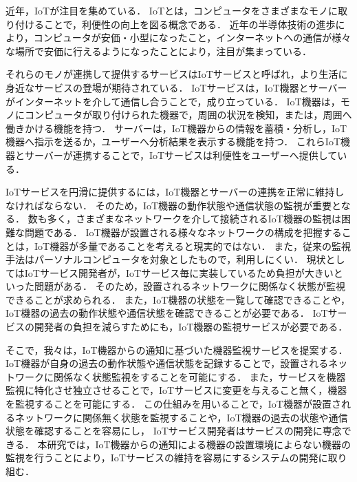 近年，IoTが注目を集めている．
IoTとは，コンピュータをさまざまなモノに取り付けることで，利便性の向上を図る概念である．
近年の半導体技術の進歩により，コンピュータが安価・小型になったこと，インターネットへの通信が様々な場所で安価に行えるようになったことにより，注目が集まっている．
\medskip

それらのモノが連携して提供するサービスはIoTサービスと呼ばれ，より生活に身近なサービスの登場が期待されている．
IoTサービスは，IoT機器とサーバーがインターネットを介して通信し合うことで，成り立っている．
IoT機器は，モノにコンピュータが取り付けられた機器で，周囲の状況を検知，または，周囲へ働きかける機能を持つ．
サーバーは，IoT機器からの情報を蓄積・分析し，IoT機器へ指示を送るか，ユーザーへ分析結果を表示する機能を持つ．
これらIoT機器とサーバーが連携することで，IoTサービスは利便性をユーザーへ提供している．
\medskip

IoTサービスを円滑に提供するには，IoT機器とサーバーの連携を正常に維持しなければならない．
そのため，IoT機器の動作状態や通信状態の監視が重要となる．
数も多く，さまざまなネットワークを介して接続されるIoT機器の監視は困難な問題である．
IoT機器が設置される様々なネットワークの構成を把握することは，IoT機器が多量であることを考えると現実的ではない．
また，従来の監視手法はパーソナルコンピュータを対象としたもので，利用しにくい．
現状としてはIoTサービス開発者が，IoTサービス毎に実装しているため負担が大きいといった問題がある．
そのため，設置されるネットワークに関係なく状態が監視できることが求められる．
また，IoT機器の状態を一覧して確認できることや，IoT機器の過去の動作状態や通信状態を確認できることが必要である．
IoTサービスの開発者の負担を減らすためにも，IoT機器の監視サービスが必要である．
\medskip

そこで，我々は，IoT機器からの通知に基づいた機器監視サービスを提案する．
IoT機器が自身の過去の動作状態や通信状態を記録することで，設置されるネットワークに関係なく状態監視をすることを可能にする．
また，サービスを機器監視に特化させ独立させることで，IoTサービスに変更を与えること無く，機器を監視することを可能にする．
この仕組みを用いることで，IoT機器が設置されるネットワークに関係無く状態を監視することや，IoT機器の過去の状態や通信状態を確認することを容易にし，
IoTサービス開発者はサービスの開発に専念できる．
本研究では，IoT機器からの通知による機器の設置環境によらない機器の監視を行うことにより，IoTサービスの維持を容易にするシステムの開発に取り組む．
\medskip

